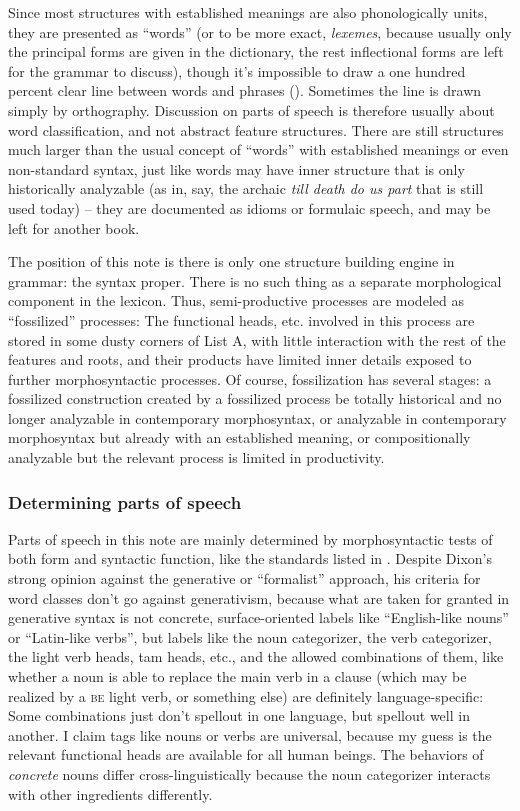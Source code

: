 \documentclass[UTF8, a4paper, oneside, scheme=plain]{ctexrep}
\newcommand*{\citesec}[1]{\S~{#1}}
\newcommand*{\term}[1]{\emph{#1}}
\newcommand{\corpus}[1]{\emph{#1}}
\newcommand{\category}[1]{\textsc{#1}}
\begin{document}
Since most structures with established meanings 
are also phonologically units,
they are presented as ``words''
(or to be more exact, \term{lexemes}, 
because usually only the principal forms are given in the dictionary,
the rest inflectional forms are left for the grammar to discuss),
though it's impossible to draw a one hundred percent clear line 
between words and phrases ().
Sometimes the line is drawn simply by orthography.
Discussion on parts of speech is therefore usually about word classification,
and not abstract feature structures.
There are still structures much larger than the usual concept of ``words'' 
with established meanings or even non-standard syntax,
just like words may have inner structure that is only historically analyzable
(as in, say, the archaic \corpus{till death do us part} that is still used today) -- 
they are documented as idioms or formulaic speech,
and may be left for another book.

The position of this note is there is only one structure building engine in grammar:
the syntax proper.
There is no such thing as a separate morphological component in the lexicon.
Thus, semi-productive processes 
are modeled as ``fossilized'' processes:
The functional heads, etc. involved in this process 
are stored in some dusty corners of List A,
with little interaction with the rest of the features and roots,
and their products have limited inner details exposed to further morphosyntactic processes.
Of course, fossilization has several stages:
a fossilized construction created by a fossilized process 
be totally historical and no longer analyzable in contemporary morphosyntax,
or analyzable in contemporary morphosyntax but already with an established meaning,
or compositionally analyzable but the relevant process is limited in productivity.

\subsubsection{Determining parts of speech}\label{sec:pos}

Parts of speech in this note are mainly determined 
by morphosyntactic tests of both form and syntactic function,
like the standards listed in \citet[\citesec{3.3}]{dixon2009basic1}.
Despite Dixon's strong opinion against the generative or ``formalist'' approach,
his criteria for word classes don't go against generativism,
because what are taken for granted in generative syntax 
is not concrete, surface-oriented labels like ``English-like nouns'' or ``Latin-like verbs'', 
but labels like the noun categorizer, the verb categorizer,
the light verb heads, \acs{tam} heads, etc.,
and the allowed combinations of them, 
like whether a noun is able to replace the main verb in a clause 
(which may be realized by a \category{be} light verb, or something else)
are definitely language-specific:
Some combinations just don't spellout in one language,
but spellout well in another.
I claim tags like nouns or verbs are universal,
because my guess is the relevant functional heads are available for all human beings.
The behaviors of \emph{concrete} nouns differ cross-linguistically
because the noun categorizer interacts with other ingredients differently.
\end{document}
